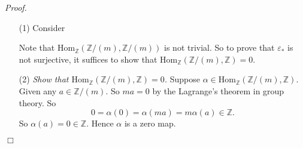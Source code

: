\documentclass{article}
\begin{document}
\emph{Proof.}
\begin{enumerate}
\item[(1)]
  Consider
  \begin{center}
  \end{center}
  Note that $\mathrm{Hom}_{\mathbb{Z}}(\mathbb{Z}/(m),\mathbb{Z}/(m))$ is not trivial.
  So to prove that $\varepsilon_{*}$ is not surjective,
  it suffices to show that $\mathrm{Hom}_{\mathbb{Z}}(\mathbb{Z}/(m),\mathbb{Z}) = 0$.

\item[(2)]
  \emph{Show that $\mathrm{Hom}_{\mathbb{Z}}(\mathbb{Z}/(m),\mathbb{Z}) = 0$.}
  Suppose $\alpha \in \mathrm{Hom}_{\mathbb{Z}}(\mathbb{Z}/(m),\mathbb{Z})$.
  Given any $a \in \mathbb{Z}/(m)$.
  So $ma = 0$ by the Lagrange's theorem in group theory.
  So
  \[
    0 = \alpha(0) = \alpha(ma) = m \alpha(a) \in \mathbb{Z}.
  \]
  So $\alpha(a) = 0 \in \mathbb{Z}$.
  Hence $\alpha$ is a zero map.
\end{enumerate}
$\Box$ \\\\



\end{document}
